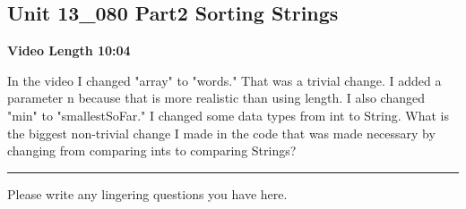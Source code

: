 \documentclass[letterpaper,12pt]{exam}
\newcommand{\unit}{Unit 13}
\begin{document}
\begin{questions}
\section*{\unit\_080 Part2 Sorting Strings } 
\par{\selectfont\textbf{Video Length 10:04}}
\begin{samepage}
    \question In the video I changed "array" to "words."  That was a trivial change.  I added a parameter n because that is more realistic than using length.  I also changed "min" to "smallestSoFar."  I changed some data types from int to String.  What is the biggest non-trivial change I made in the code that was made necessary by changing from comparing ints to comparing Strings?
    \vspace{5mm}
\end{samepage}

\begin{center}
    \rule{0.5\textwidth}{.4pt}
\end{center}
Please write any lingering questions you have here.
\end{questions}
\end{document}
